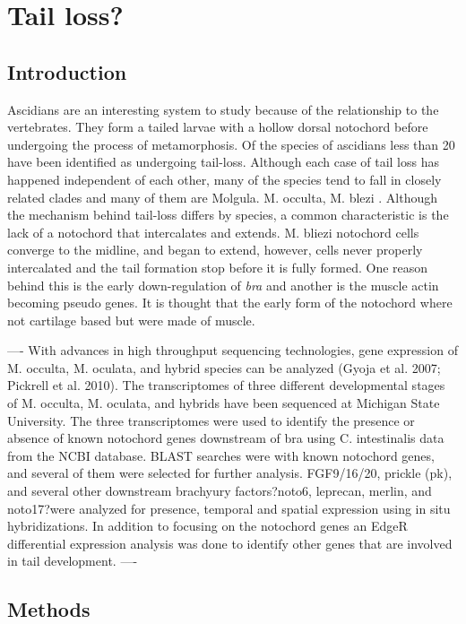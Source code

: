 \chapter{Tail loss?}

\section{Introduction}
Ascidians are an interesting system to study because of the relationship to the vertebrates. They form a tailed larvae with a hollow dorsal notochord before undergoing the process of metamorphosis. Of the  species of ascidians less than 20 have been identified as undergoing tail-loss. Although each case of tail loss has happened independent of each other, many of the species tend to fall in closely related clades and many of them are Molgula. M. occulta, M. blezi . Although the mechanism behind tail-loss differs by species, a common characteristic is the lack of a notochord that intercalates and extends. M. bliezi notochord cells converge to the midline, and began to extend, however, cells never properly intercalated and the tail formation stop before it is fully formed. One reason behind this is the early down-regulation of \textit{bra} and another is the muscle actin becoming pseudo genes. It is thought that the early form of the notochord where not cartilage based but were made of muscle.  

----
With advances in high throughput sequencing technologies, gene expression of M. occulta, M. oculata, and hybrid species can be analyzed (Gyoja et al. 2007; Pickrell et al. 2010). The transcriptomes of three different developmental stages of M. occulta, M. oculata, and hybrids have been sequenced at Michigan State University. The three transcriptomes were used to identify the presence or absence of known notochord genes downstream of bra using C. intestinalis data from the NCBI database. BLAST searches were with known notochord genes, and several of them were selected for further analysis. FGF9/16/20, prickle (pk), and several other downstream brachyury factors?noto6, leprecan, merlin, and noto17?were analyzed for presence, temporal and spatial expression using in situ hybridizations. In addition to focusing on the notochord genes an EdgeR differential expression analysis was done to identify other genes that are involved in tail development.
----
\section{Methods}
